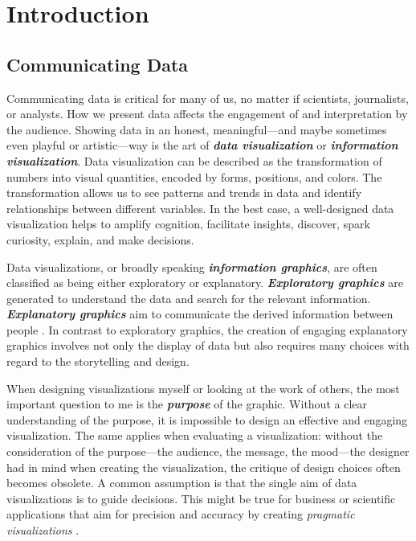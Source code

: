\documentclass[
]{krantz}
\begin{document}
\hypertarget{introduction}{%
\chapter{Introduction}\label{introduction}}

\hypertarget{communication}{%
\section{Communicating Data}\label{communication}}

Communicating data is critical for many of us, no matter if scientists, journalists, or analysts. How we present data affects the engagement of and interpretation by the audience. Showing data in an honest, meaningful---and maybe sometimes even playful or artistic---way is the art of \textbf{\emph{data visualization}} or \textbf{\emph{information visualization}}. Data visualization can be described as the transformation of numbers into visual quantities, encoded by forms, positions, and colors. The transformation allows us to see patterns and trends in data and identify relationships between different variables. In the best case, a well-designed data visualization helps to amplify cognition, facilitate insights, discover, spark curiosity, explain, and make decisions.

Data visualizations, or broadly speaking \textbf{\emph{information graphics}}, are often classified as being either exploratory or explanatory. \textbf{\emph{Exploratory graphics}} are generated to understand the data and search for the relevant information. \textbf{\emph{Explanatory graphics}} aim to communicate the derived information between people \citep{koponen&hilden2019}. In contrast to exploratory graphics, the creation of engaging explanatory graphics involves not only the display of data but also requires many choices with regard to the storytelling and design.

When designing visualizations myself or looking at the work of others, the most important question to me is the \textbf{\emph{purpose}} of the graphic. Without a clear understanding of the purpose, it is impossible to design an effective and engaging visualization. The same applies when evaluating a visualization: without the consideration of the purpose---the audience, the message, the mood---the designer had in mind when creating the visualization, the critique of design choices often becomes obsolete. A common assumption is that the single aim of data visualizations is to guide decisions. This might be true for business or scientific applications that aim for precision and accuracy by creating \emph{pragmatic visualizations} \citep{kosara2007}.
\end{document}
